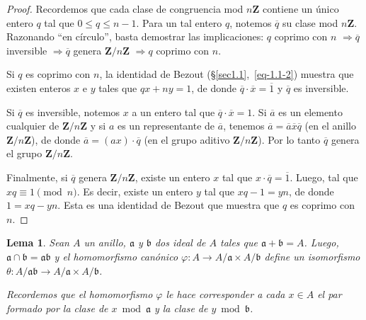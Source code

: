 \documentclass[10pt,oneside,bibtotoc,smallheadings,leqno,a5paper,DIV=12]{scrbook}
\newcommand{\ZZ}{\mathbf{Z}}
\newcommand{\idl}[1]{\mathfrak{#1}}
\newcommand{\QED}{}%
\newcommand{\oline}[1]{\overline{#1}}
\newcommand{\then}{\ensuremath{\Rightarrow}\xspace}
\renewcommand{\to}[1][]{\xrightarrow{#1}}
\numberwithin{equation}{section}
\newenvironment{comm}%
	{\begin{trivlist}\item\small\itshape}
	{\end{trivlist}}
\theoremstyle{defi}
\theoremstyle{enonce}
\newtheorem{lemma}{Lema}
\theoremstyle{rem}
\numberwithin{theorem}{section}
\numberwithin{proposition}{section}
\numberwithin{definition}{section}
\numberwithin{lemma}{section}
\numberwithin{corollary}{section}
\numberwithin{example}{section}
\numberwithin{footnote}{section}%
\begin{document}
\begin{proof}
Recordemos que cada clase de congruencia mod $n\ZZ$ contiene un \'unico entero $q$ tal que
$0\leq q\leq n-1$. Para un tal entero $q$, notemos $\oline q$ su clase mod $n\ZZ$.
Razonando ``en c\'irculo'', basta demostrar las implicaciones: $q$ coprimo con $n$ \then $\oline q$ inversible
\then $\oline q$ genera $\ZZ/n\ZZ$ \then $q$ coprimo con $n$.

Si $q$ es coprimo con $n$, la
identidad de Bezout (\S\ref{sec1.1},~\eqref{eq-1.1-2}) muestra que existen enteros $x$ e $y$ tales que
$qx+ny = 1$, de donde $\oline q\cdot\oline x = \oline 1$ y $\oline q$ es inversible.

Si $\oline q$ es inversible, notemos $x$ a un entero tal que $\oline q\cdot\oline x = 1$.
Si $\oline a$ es un elemento cualquier de $\ZZ/n\ZZ$ y si $a$ es un representante de $\oline a$,
tenemos $\oline a = \oline a\oline x\oline q$ (en el anillo $\ZZ/n\ZZ$), de donde
$\oline a = (ax)\cdot\oline q$ (en el grupo aditivo $\ZZ/n\ZZ$). Por lo tanto $\oline q$
genera el grupo $\ZZ/n\ZZ$.

Finalmente, si $\oline q$ genera $\ZZ/n\ZZ$, existe un entero
$x$ tal que $x\cdot\oline q = \oline 1$. Luego, tal que $xq\equiv 1\pmod n$. Es decir,
existe un entero $y$ tal que $xq-1=yn$, de donde $1 = xq-yn$. Esta es una identidad de Bezout
que muestra que $q$ es coprimo con $n$.%
\end{proof}

\begin{lemma}\label{lem1.3.1}
Sean $A$ un anillo, $\idl{a}$ y $\idl{b}$ dos ideal de $A$ tales que $\idl{a}+\idl{b}=A$.
Luego, $\idl{a}\cap\idl{b} = \idl{a}\idl{b}$ y el homomorfismo can\'onico
$\varphi:A\to A/\idl{a}\times A/\idl{b}$ define un isomorfismo $\theta:A/\idl{a}\idl{b}\to A/\idl{a}\times
A/\idl{b}$.
\end{lemma}

\begin{comm}
Recordemos que el homomorfismo $\varphi$ le hace corresponder a cada $x\in A$ el par formado
por la clase de $x\bmod\idl{a}$ y la clase de $y\bmod\idl{b}$.
\end{comm}
\end{document}

